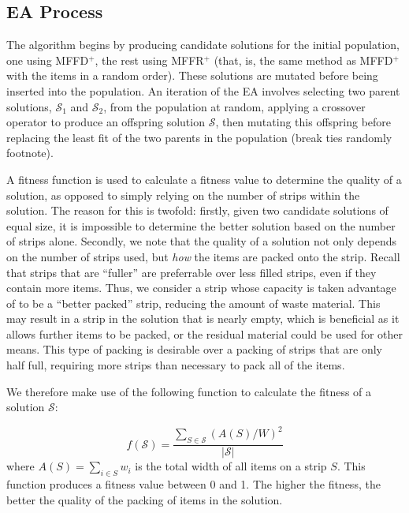 \documentclass{elsarticle}
\begin{document}
\subsection{EA Process}
\label{sub:eaframework}
The algorithm begins by producing candidate solutions for the initial population, one using MFFD$^+$, the rest using MFFR$^+$ (that, is, the same method as MFFD$^+$ with the items in a random order). These solutions are mutated before being inserted into the population. An iteration of the EA involves selecting two parent solutions, $\mathcal{S}_1$ and $\mathcal{S}_2$, from the population at random, applying a crossover operator to produce an offspring solution $\mathcal{S}$, then mutating this offspring before replacing the least fit of the two parents in the population \alert{(break ties randomly footnote). }

A fitness function is used to calculate a fitness value to determine the quality of a solution, as opposed to simply relying on the number of strips within the solution. The reason for this is twofold: firstly, given two candidate solutions of equal size, it is impossible to determine the better solution based on the number of strips alone. Secondly, we note that the quality of a solution not only depends on the number of strips used, but \emph{how} the items are packed onto the strip. Recall that strips that are ``fuller'' are preferrable over less filled strips, even if they contain more items. Thus, we consider a strip whose capacity is taken advantage of to be a ``better packed'' strip, reducing the amount of waste material. This may result in a strip in the solution that is nearly empty, which is beneficial as it allows further items to be packed, or the residual material could be used for other means. This type of packing is desirable over a packing of strips that are only half full, requiring more strips than necessary to pack all of the items. 

We therefore make use of the following function to calculate the fitness of a solution $\mathcal{S}$:

\begin{equation}
	f(\mathcal{S}) = \frac{\sum_{S \in \mathcal{S}} (A(S)/W)^2}{|\mathcal{S}|}
\end{equation}
\noindent where $A(S) = \sum_{i \in S} w_i$ is the total width of all items on a strip $S$. This function produces a fitness value between 0 and 1. The higher the fitness, the better the quality of the packing of items in the solution.
\end{document}

